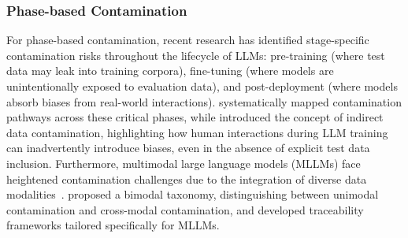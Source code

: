 \subsubsection{Phase-based Contamination}

For phase-based contamination, recent research has identified stage-specific contamination risks throughout the lifecycle of LLMs: pre-training (where test data may leak into training corpora), fine-tuning (where models are unintentionally exposed to evaluation data), and post-deployment (where models absorb biases from real-world interactions). \citet{sainz-etal-2023-nlp} systematically mapped contamination pathways across these critical phases, while \citet{balloccu-etal-2024-leak} introduced the concept of indirect data contamination, highlighting how human interactions during LLM training can inadvertently introduce biases, even in the absence of explicit test data inclusion. Furthermore, multimodal large language models (MLLMs) face heightened contamination challenges due to the integration of diverse data modalities~\cite{yin2023survey}. \citet{song2024textimagesleakedsystematic} proposed a bimodal taxonomy, distinguishing between unimodal contamination and cross-modal contamination, and developed traceability frameworks tailored specifically for MLLMs.

